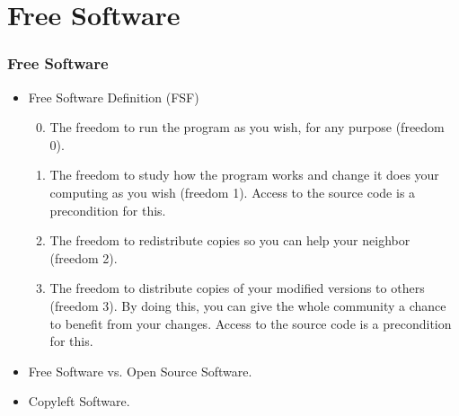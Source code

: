 \documentclass[aspectratio=169, xcolor=table, notheorems, hyperref={pdfpagelabels=false}]{beamer}
\begin{document}
\section{Free Software}
\begin{frame}
\frametitle{Free Software}
\begin{itemize}
\item Free Software Definition (FSF)
\begin{enumerate}
\setcounter{enumi}{-1}
\item The freedom to run the program as you wish, for any purpose (freedom 0).
\item The freedom to study how the program works and change it does your computing 
      as you wish (freedom 1). Access to the source code is a precondition for this.
\item The freedom to redistribute copies so you can help your neighbor (freedom 2).
\item The freedom to distribute copies of your modified versions to others (freedom 3).
      By doing this, you can give the whole community a chance to benefit from your changes.
      Access to the source code is a precondition for this.
\end{enumerate}
\item Free Software vs. Open Source Software.
\item Copyleft Software.
\end{itemize}
\end{frame}

\end{document}
